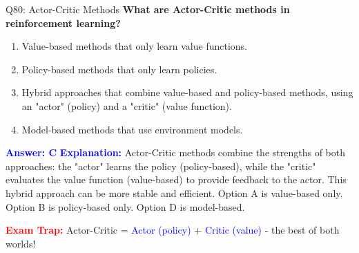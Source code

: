 \documentclass[8pt]{beamer}
\begin{document}
	\begin{frame}{Q80: Actor-Critic Methods}
		\fontsize{6.5}{7.5}\selectfont
		\textbf{What are Actor-Critic methods in reinforcement learning?}
		
		\begin{enumerate}
			\item Value-based methods that only learn value functions.
			\item Policy-based methods that only learn policies.
			\item Hybrid approaches that combine value-based and policy-based methods, using an "actor" (policy) and a "critic" (value function).
			\item Model-based methods that use environment models.
		\end{enumerate}
		
		\vspace{0.1cm}
		\textcolor{blue}{\textbf{Answer: C}}
		\vspace{0.1cm}
		\textcolor{blue}{\textbf{Explanation:}} Actor-Critic methods combine the strengths of both approaches: the "actor" learns the policy (policy-based), while the "critic" evaluates the value function (value-based) to provide feedback to the actor. This hybrid approach can be more stable and efficient. Option A is value-based only. Option B is policy-based only. Option D is model-based.
		
		\textcolor{red}{\textbf{Exam Trap:}} Actor-Critic = \textcolor{blue}{Actor (policy)} + \textcolor{blue}{Critic (value)} - the best of both worlds!
	\end{frame}
	
	
\end{document}
